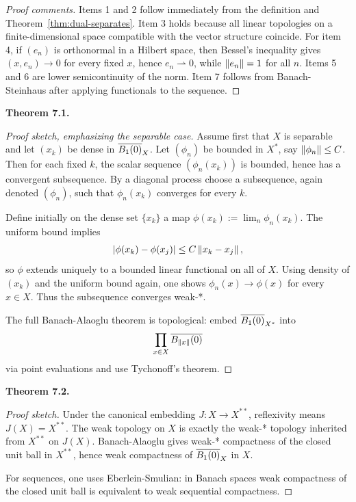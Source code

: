 \documentclass[11pt]{article}
\newenvironment{theoremstmt}[1]{%
  \par\medskip\noindent\textbf{Theorem #1. }\itshape
}{\par\medskip}
\begin{document}
\begin{proof}[Proof comments]
Items 1 and 2 follow immediately from the definition and Theorem~\ref{thm:dual-separates}. Item 3 holds because all linear topologies on a finite-dimensional space compatible with the vector structure coincide. For item 4, if $(e_n)$ is orthonormal in a Hilbert space, then Bessel's inequality gives $(x,e_n)\to 0$ for every fixed $x$, hence $e_n\rightharpoonup 0$, while $\left\lVert e_n\right\rVert=1$ for all $n$. Items 5 and 6 are lower semicontinuity of the norm. Item 7 follows from Banach-Steinhaus after applying functionals to the sequence.
\end{proof}

\begin{theoremstmt}{7.1}
\thmBanachAlaoglu
\end{theoremstmt}

\begin{proof}[Proof sketch, emphasizing the separable case]
Assume first that $X$ is separable and let $(x_k)$ be dense in $\overline{B_1(0)}_X$. Let $(\phi_n)$ be bounded in $X^*$, say $\left\lVert \phi_n\right\rVert\le C$. Then for each fixed $k$, the scalar sequence $(\phi_n(x_k))$ is bounded, hence has a convergent subsequence. By a diagonal process choose a subsequence, again denoted $(\phi_n)$, such that $\phi_n(x_k)$ converges for every $k$.

Define initially on the dense set $\{x_k\}$ a map $\phi(x_k):=\lim_n \phi_n(x_k)$. The uniform bound implies
\[
\left\lvert \phi(x_k)-\phi(x_j)\right\rvert\le C\left\lVert x_k-x_j\right\rVert,
\]
so $\phi$ extends uniquely to a bounded linear functional on all of $X$. Using density of $(x_k)$ and the uniform bound again, one shows $\phi_n(x)\to \phi(x)$ for every $x\in X$. Thus the subsequence converges weak-*.

The full Banach-Alaoglu theorem is topological: embed $\overline{B_1(0)}_{X^*}$ into
\[
\prod_{x\in X}\overline{B_{\left\lVert x\right\rVert}(0)}
\]
via point evaluations and use Tychonoff's theorem.
\end{proof}

\begin{theoremstmt}{7.2}
\thmReflexiveWeaklyCompact
\end{theoremstmt}

\begin{proof}[Proof sketch]
Under the canonical embedding $J:X\to X^{**}$, reflexivity means $J(X)=X^{**}$. The weak topology on $X$ is exactly the weak-* topology inherited from $X^{**}$ on $J(X)$. Banach-Alaoglu gives weak-* compactness of the closed unit ball in $X^{**}$, hence weak compactness of $\overline{B_1(0)}_X$ in $X$.

For sequences, one uses Eberlein-Smulian: in Banach spaces weak compactness of the closed unit ball is equivalent to weak sequential compactness.
\end{proof}
\end{document}
